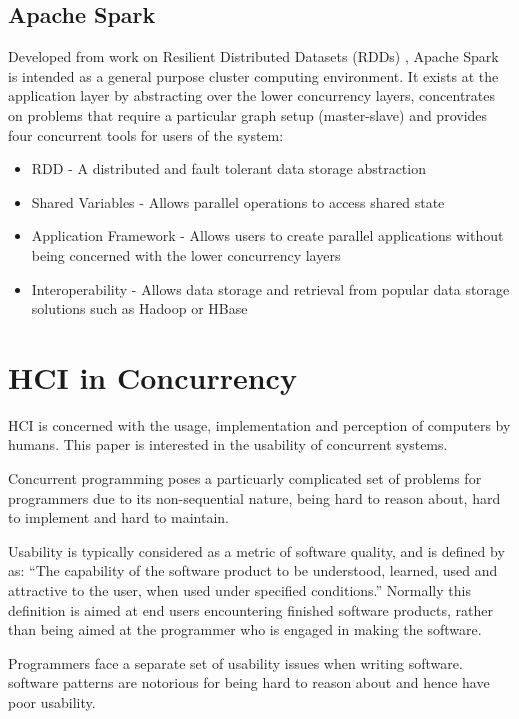 \documentclass{sig-alternate}
\begin{document}
\subsection{Apache Spark}
Developed from work on Resilient Distributed Datasets (RDDs)  \cite{zaharia14:_archit_fast_gener_data_proces_large_clust},  Apache Spark is intended as a general purpose cluster computing environment. It exists at the application layer by abstracting over the lower concurrency layers, concentrates on problems that require a particular graph setup (master-slave) and provides four concurrent tools for users of the system:

\begin{itemize}
\item RDD - A distributed and fault tolerant data storage abstraction
\item Shared Variables - Allows parallel operations to access shared state
\item Application Framework - Allows users to create parallel applications without being concerned with the lower concurrency layers
\item Interoperability - Allows data storage and retrieval from popular data storage solutions such as Hadoop or HBase
\end{itemize}

\section{HCI in Concurrency}
HCI is concerned with the usage, implementation and perception of computers by humans. This paper is interested in the usability of concurrent systems. 

Concurrent programming poses a particuarly complicated set of problems for programmers due to its non-sequential nature, being hard to reason about, hard to implement and hard to maintain. 


Usability is typically considered as a metric of software quality, and is defined by \cite{9126} as: ``The capability of the software product to be understood, learned, used and attractive to the user, when used under specified conditions.'' Normally this definition is aimed at end users encountering finished software products, rather than being aimed at the programmer who is engaged in making the software.

Programmers face a separate set of usability issues when writing software.  software patterns are notorious for being hard to reason about and hence have poor usability.
\end{document}
